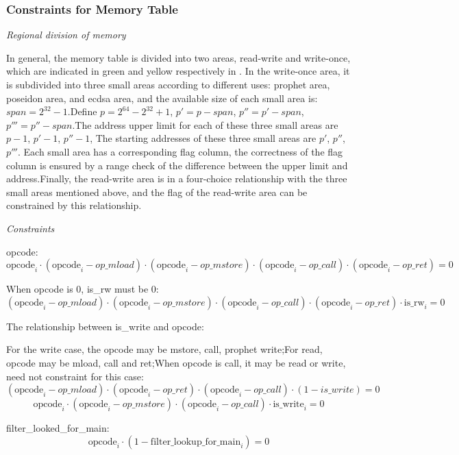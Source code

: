 \subsubsection{Constraints for Memory Table} \label{sec:memory-constraints}

\emph{Regional division of memory}

In general, the memory table is divided into two areas, read-write and write-once, which are indicated in green and yellow respectively in .
In the write-once area, it is subdivided into three small areas according to different uses: prophet area, poseidon area, and ecdsa area, and the available size of each small area is:
$span = 2^{32} - 1$.Define $p =2^{64} - 2^{32} + 1$, $p'=p-span$, $p''=p'-span$, $p'''=p''-span$.The address upper limit for each of these three small areas are $p-1$, $p'-1$, $p''-1$,
The starting addresses of these three small areas are $p'$, $p''$, $p'''$.
Each small area has a corresponding flag column, the correctness of the flag column is ensured by a
range check of the difference between the upper limit and address.Finally, the read-write area is in a four-choice relationship with the three small areas mentioned above, and the
flag of the read-write area can be constrained by this relationship.

\emph{Constraints}

opcode:
\[\mathrm{opcode}_i \cdot (\mathrm{opcode}_i - op\_mload) \cdot (\mathrm{opcode}_i-op\_mstore) \cdot (\mathrm{opcode}_i-op\_call) \cdot (\mathrm{opcode}_i-op\_ret)=0 \]

When opcode is 0, is\_rw must be 0:
\[ (\mathrm{opcode}_i-op\_mload) \cdot (\mathrm{opcode}_i-op\_mstore) \cdot (\mathrm{opcode}_i-op\_call) \cdot (\mathrm{opcode}_i-op\_ret) \cdot \mathrm{is\_rw}_i=0 \]

The relationship between is\_write and opcode:

For the write case, the opcode may be mstore, call, prophet write;For read, opcode may be mload, call and ret;When opcode is call, it may be read or write, need not constraint for this case:
\[ (\mathrm{opcode}_i-op\_mload) \cdot (\mathrm{opcode}_i - op\_ret) \cdot (\mathrm{opcode}_i - op\_call) \cdot (1-is\_write) = 0 \]
\[ \mathrm{opcode}_i \cdot (\mathrm{opcode}_i - op\_mstore) \cdot (\mathrm{opcode}_i - op\_call) \cdot \mathrm{is\_write}_i=0 \]

filter\_looked\_for\_main:
\[ \mathrm{opcode}_i \cdot (1-\mathrm{filter\_lookup\_for\_main}_i)=0 \]

